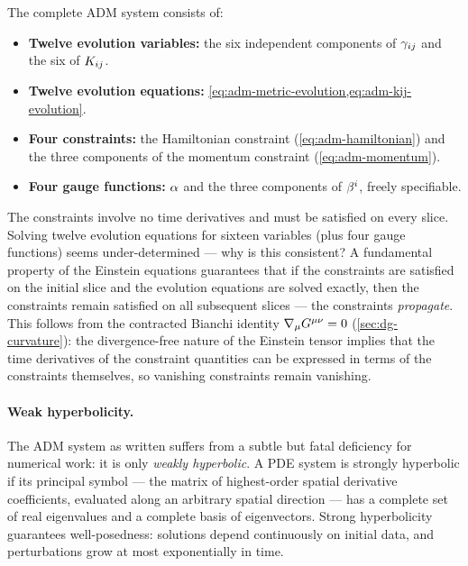 The complete ADM system consists of:
%
\begin{itemize}
  \item \textbf{Twelve evolution variables:} the six independent components
    of $\gamma_{ij}$ and the six of $K_{ij}$.
  \item \textbf{Twelve evolution equations:}
    \cref{eq:adm-metric-evolution,eq:adm-kij-evolution}.
  \item \textbf{Four constraints:} the Hamiltonian constraint
    (\cref{eq:adm-hamiltonian}) and the three components of the momentum
    constraint (\cref{eq:adm-momentum}).
  \item \textbf{Four gauge functions:} $\alpha$ and the three components of
    $\beta^{i}$, freely specifiable.
\end{itemize}
%
The constraints involve no time derivatives and must be satisfied on every
slice.  Solving twelve evolution equations for sixteen variables (plus four
gauge functions) seems under-determined --- why is this consistent?  A
fundamental property of the Einstein equations guarantees that if
the constraints are satisfied on the initial slice and the evolution
equations are solved exactly, then the constraints remain satisfied on all
subsequent slices --- the constraints \emph{propagate}.  This follows from
the contracted Bianchi identity $\nabla_{\mu}G^{\mu\nu} = 0$
(\cref{sec:dg-curvature}): the divergence-free nature of the Einstein
tensor implies that the time derivatives of the constraint quantities can
be expressed in terms of the constraints themselves, so vanishing
constraints remain vanishing.

\paragraph{Weak hyperbolicity.}

The ADM system as written suffers from a subtle but fatal deficiency for
numerical work: it is only \emph{weakly hyperbolic}.  A PDE system is
strongly hyperbolic if its principal symbol --- the matrix of highest-order
spatial derivative coefficients, evaluated along an arbitrary spatial
direction --- has a complete set of real eigenvalues and a complete basis of
eigenvectors.  Strong hyperbolicity guarantees well-posedness: solutions
depend continuously on initial data, and perturbations grow at most
exponentially in time.

